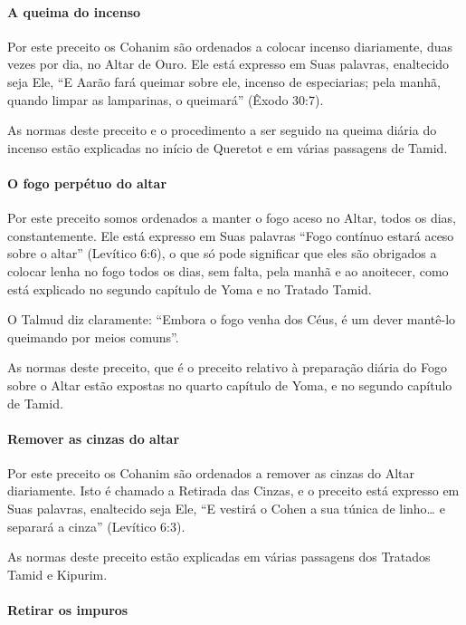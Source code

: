 \paragraph{A queima do incenso}

Por este preceito os Cohanim são ordenados a colocar incenso
diariamente, duas vezes por dia, no Altar de Ouro. Ele está expresso em
Suas palavras, enaltecido seja Ele, ``E Aarão fará queimar sobre ele,
incenso de especiarias; pela manhã, quando limpar as lamparinas, o
queimará'' (Êxodo 30:7).

As normas deste preceito e o procedimento a ser seguido na queima diária
do incenso estão explicadas no início de Queretot e em várias passagens
de Tamid.

\paragraph{O fogo perpétuo do altar}

Por este preceito somos ordenados a manter o fogo aceso no Altar, todos
os dias, constantemente. Ele está expresso em Suas palavras ``Fogo
contínuo estará aceso sobre o altar'' (Levítico 6:6), o que só pode
significar que eles são obrigados a colocar lenha no fogo todos os dias,
sem falta, pela manhã e ao anoitecer, como está explicado no segundo
capítulo de Yoma e no Tratado Tamid.

O Talmud diz claramente: ``Embora o fogo venha dos Céus, é um dever
mantê-lo queimando por meios comuns''.

As normas deste preceito, que é o preceito relativo à preparação diária
do Fogo sobre o Altar estão expostas no quarto capítulo de Yoma, e no
segundo capítulo de Tamid.

\paragraph{Remover as cinzas do altar}

Por este preceito os Cohanim são ordenados a remover as cinzas do
Altar diariamente. Isto é chamado a Retirada das Cinzas, e o preceito
está expresso em Suas palavras, enaltecido seja Ele, ``E vestirá o
Cohen a sua túnica de linho\ldots{} e separará a cinza'' (Levítico 6:3).

As normas deste preceito estão explicadas em várias passagens dos
Tratados Tamid e Kipurim.

\paragraph{Retirar os impuros}

